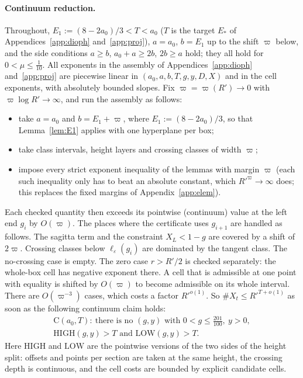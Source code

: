 \documentclass[aps,prx,twocolumn,superscriptaddress,nofootinbib,longbibliography]{revtex4-2}
\theoremstyle{plain}
\theoremstyle{definition}
\theoremstyle{remark}
\begin{document}
\paragraph{Continuum reduction.} Throughout, $E_1:=(8-2a_0)/3<T<a_0$ ($T$ is the target $E_*$ of Appendices~\ref{app:dioph} and~\ref{app:proj}), $a=a_0$, $b=E_1$ up to the shift $\varpi$ below, and the side conditions
$a\ge b$, $a_0+a\ge2b$, $2b\ge a$ hold; they all hold for $0<\mu\le\frac1{10}$. All exponents in the assembly of Appendices~\ref{app:dioph}
and~\ref{app:proj} are piecewise linear in $(a_0,a,b,T,g,y,D,X)$ and in the cell exponents, with
absolutely bounded slopes. Fix $\varpi=\varpi(R')\to0$ with $\varpi\log R'\to\infty$, and run the assembly
as follows:
\begin{itemize}\setlength\itemsep{0pt}
\item take $a=a_0$ and $b=E_1+\varpi$, where $E_1:=(8-2a_0)/3$, so that Lemma~\ref{lem:E1} applies with one
hyperplane per box;
\item take class intervals, height layers and crossing classes of width $\varpi$;
\item impose every strict exponent inequality of the lemmas with margin $\varpi$ (each such inequality only has to beat an absolute constant, which $R'^{\varpi}\to\infty$ does; this replaces the fixed margins of Appendix~\ref{app:elem}).
\end{itemize}
Each checked quantity then exceeds its pointwise (continuum) value at the left end $g_i$ by $O(\varpi)$.
The places where the certificate uses $g_{i+1}$ are handled as follows. The sagitta term and the constraint
$X_L<1-g$ are covered by a shift of $2\varpi$. Crossing classes below $\ell_\varepsilon(g_i)$ are dominated by the
tangent class. The no-crossing case is empty. The zero case $r>R'/2$ is checked separately: the whole-box
cell has negative exponent there. A cell that is admissible
at one point with equality is shifted by $O(\varpi)$ to become admissible on its whole interval. There are
$O(\varpi^{-3})$ cases, which costs a factor $R'^{o(1)}$. So $\#X_t\le R'^{T+o(1)}$ as soon as the
following continuum claim holds:
\begin{multline*}
\mathrm C(a_0,T):\ \text{there is no }(g,y)\text{ with }0<g\le\tfrac{201}{100},\ y>0,\\
\mathrm{HIGH}(g,y)>T\text{ and }\mathrm{LOW}(g,y)>T .
\end{multline*}
Here $\mathrm{HIGH}$ and $\mathrm{LOW}$ are the pointwise versions of the two sides of the height split:
offsets and points per section are taken at the same height, the crossing depth is continuous, and the
cell costs are bounded by explicit candidate cells.
\end{document}
